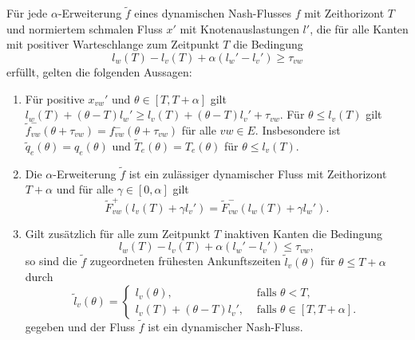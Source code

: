 \begin{theorem}\label{thm-alpha-extension-is-nash-flow}
	Für jede $\alpha$-Erweiterung $\tilde{f}$ eines dynamischen Nash-Flusses $f$ mit Zeithorizont $T$ und normiertem schmalen Fluss $x'$ mit Knotenauslastungen $l'$, die für alle Kanten mit positiver Warteschlange zum Zeitpunkt $T$ die Bedingung
	\begin{equation}\tag{$\alpha 1$}\label{equation-alpha-queuing-edge}
		l_w(T) - l_v(T) + \alpha(l_w' - l_v') \geq \tau_{vw}
	\end{equation}
	erfüllt, gelten die folgenden Aussagen:
	\begin{enumerate}[label=(\roman*)]
		\item Für positive $x_{vw}'$ und $\theta\in[T, T+\alpha]$ gilt $l_w(T) + (\theta - T)l_w' \geq l_v(T) + (\theta - T)l_v' + \tau_{vw}$.
		Für $\theta \leq l_v(T)$ gilt $\tilde{f}^-_{vw}(\theta + \tau_{vw})=f^-_{vw}(\theta + \tau_{vw})$ für alle $vw\in E$.
		Insbesondere ist $\tilde{q}_e(\theta) = q_e(\theta)$ und $\tilde{T}_e(\theta) = T_e(\theta)$ für $\theta \leq l_v(T)$.
		\item Die $\alpha$-Erweiterung $\tilde{f}$ ist ein zulässiger dynamischer Fluss mit Zeithorizont $T+\alpha$ und für alle $\gamma \in [0, \alpha]$ gilt
		\[ \tilde{F}_{vw}^+(l_v(T) + \gamma l_v') = \tilde{F}_{vw}^-(l_w(T) + \gamma l_w'). \]
		\item Gilt zusätzlich für alle zum Zeitpunkt $T$ inaktiven Kanten die Bedingung \begin{equation}\tag{$\alpha 2$}\label{equation-alpha-inactive-edge}
		l_w(T) - l_v(T) + \alpha(l_w' -l_v') \leq \tau_{vw},
		\end{equation}
		so sind die $\tilde{f}$ zugeordneten frühesten Ankunftszeiten $\tilde{l}_v(\theta)$ für $\theta \leq T+\alpha$ durch
		\[ \tilde{l}_v(\theta) = \begin{cases}
		l_v(\theta), & \text{ falls $\theta < T$,} \\
		l_v(T) + (\theta - T) l_v', & \text{ falls $\theta \in [T, T+\alpha]$.}
		\end{cases}\]
		gegeben und der Fluss $\tilde{f}$ ist ein dynamischer Nash-Fluss.
	\end{enumerate}
\end{theorem}
